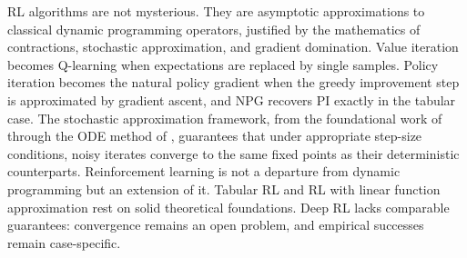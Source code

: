 RL algorithms are not mysterious. They are asymptotic approximations to classical dynamic programming operators, justified by the mathematics of contractions, stochastic approximation, and gradient domination. Value iteration becomes Q-learning \citep{WatkinsDayan1992, tsitsiklis1994} when expectations are replaced by single samples. Policy iteration becomes the natural policy gradient \citep{Kakade2001, agarwal2021theory} when the greedy improvement step is approximated by gradient ascent, and NPG recovers PI exactly in the tabular case. The stochastic approximation framework, from the foundational work of \citet{Robbins1952} through the ODE method of \citet{borkar2000}, guarantees that under appropriate step-size conditions, noisy iterates converge to the same fixed points as their deterministic counterparts. Reinforcement learning is not a departure from dynamic programming but an extension of it. Tabular RL and RL with linear function approximation rest on solid theoretical foundations. Deep RL lacks comparable guarantees: convergence remains an open problem, and empirical successes remain case-specific.

